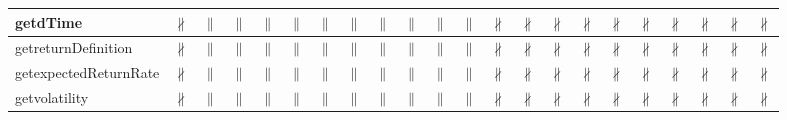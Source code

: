\documentclass[10pt]{article}
\begin{document}
\begin{longtable}{|l|l|l|l|l|l|l|l|l|l|l|l|l|l|l|l|l|l|l|l|l|l|}
\hline
getdTime&{\color{BrickRed}$\nparallel$}&{\color{blue}$\parallel$}&{\color{blue}$\parallel$}&{\color{blue}$\parallel$}&{\color{blue}$\parallel$}&{\color{blue}$\parallel$}&{\color{blue}$\parallel$}&{\color{blue}$\parallel$}&{\color{blue}$\parallel$}&{\color{blue}$\parallel$}&{\color{blue}$\parallel$}&{\color{BrickRed}$\nparallel$}&{\color{BrickRed}$\nparallel$}&{\color{BrickRed}$\nparallel$}&{\color{BrickRed}$\nparallel$}&{\color{BrickRed}$\nparallel$}&{\color{BrickRed}$\nparallel$}&{\color{BrickRed}$\nparallel$}&{\color{BrickRed}$\nparallel$}&{\color{BrickRed}$\nparallel$}&{\color{BrickRed}$\nparallel$}\\
\hline
getreturnDefinition&{\color{BrickRed}$\nparallel$}&{\color{blue}$\parallel$}&{\color{blue}$\parallel$}&{\color{blue}$\parallel$}&{\color{blue}$\parallel$}&{\color{blue}$\parallel$}&{\color{blue}$\parallel$}&{\color{blue}$\parallel$}&{\color{blue}$\parallel$}&{\color{blue}$\parallel$}&{\color{blue}$\parallel$}&{\color{BrickRed}$\nparallel$}&{\color{BrickRed}$\nparallel$}&{\color{BrickRed}$\nparallel$}&{\color{BrickRed}$\nparallel$}&{\color{BrickRed}$\nparallel$}&{\color{BrickRed}$\nparallel$}&{\color{BrickRed}$\nparallel$}&{\color{BrickRed}$\nparallel$}&{\color{BrickRed}$\nparallel$}&{\color{BrickRed}$\nparallel$}\\
\hline
getexpectedReturnRate&{\color{BrickRed}$\nparallel$}&{\color{blue}$\parallel$}&{\color{blue}$\parallel$}&{\color{blue}$\parallel$}&{\color{blue}$\parallel$}&{\color{blue}$\parallel$}&{\color{blue}$\parallel$}&{\color{blue}$\parallel$}&{\color{blue}$\parallel$}&{\color{blue}$\parallel$}&{\color{blue}$\parallel$}&{\color{BrickRed}$\nparallel$}&{\color{BrickRed}$\nparallel$}&{\color{BrickRed}$\nparallel$}&{\color{BrickRed}$\nparallel$}&{\color{BrickRed}$\nparallel$}&{\color{BrickRed}$\nparallel$}&{\color{BrickRed}$\nparallel$}&{\color{BrickRed}$\nparallel$}&{\color{BrickRed}$\nparallel$}&{\color{BrickRed}$\nparallel$}\\
\hline
getvolatility&{\color{BrickRed}$\nparallel$}&{\color{blue}$\parallel$}&{\color{blue}$\parallel$}&{\color{blue}$\parallel$}&{\color{blue}$\parallel$}&{\color{blue}$\parallel$}&{\color{blue}$\parallel$}&{\color{blue}$\parallel$}&{\color{blue}$\parallel$}&{\color{blue}$\parallel$}&{\color{blue}$\parallel$}&{\color{BrickRed}$\nparallel$}&{\color{BrickRed}$\nparallel$}&{\color{BrickRed}$\nparallel$}&{\color{BrickRed}$\nparallel$}&{\color{BrickRed}$\nparallel$}&{\color{BrickRed}$\nparallel$}&{\color{BrickRed}$\nparallel$}&{\color{BrickRed}$\nparallel$}&{\color{BrickRed}$\nparallel$}&{\color{BrickRed}$\nparallel$}\\

\end{longtable}
\end{document}
